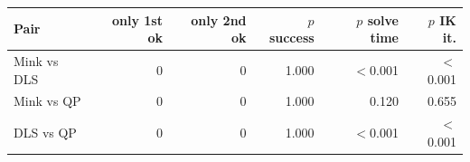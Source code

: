 \begin{tabular}{lrrrrr}
\toprule
Pair & only 1st ok & only 2nd ok & $p$ success & $p$ solve time & $p$ IK it.\\
\midrule
Mink vs DLS & 0 & 0 & 1.000 & $<$0.001 & $<$0.001\\
Mink vs QP & 0 & 0 & 1.000 & 0.120 & 0.655\\
DLS vs QP & 0 & 0 & 1.000 & $<$0.001 & $<$0.001\\
\bottomrule
\end{tabular}
